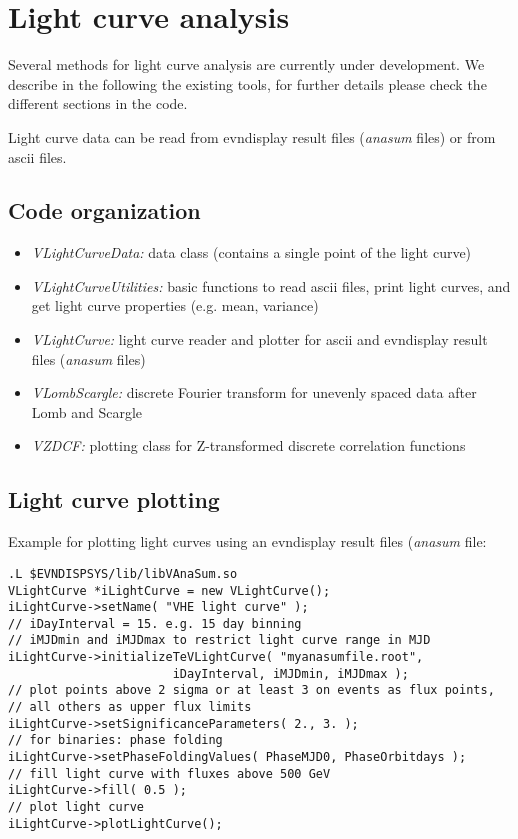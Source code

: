 \documentclass[titlepage,a4paper,twoside,11pt]{report}
\begin{document}
\chapter{Light curve analysis}

Several methods for light curve analysis are currently under development. We describe in the following the existing tools, for further details please check the different sections in the code.

Light curve data can be read from evndisplay result files ({\it anasum} files) or from ascii files.

\section{Code organization}

\begin{itemize}
\item {\it VLightCurveData:} data class (contains a single point of the light curve)
\item {\it VLightCurveUtilities:} basic functions to read ascii files, print light curves, and get light curve properties (e.g. mean, variance)
\item {\it VLightCurve:} light curve reader and plotter for ascii and evndisplay result files ({\it anasum} files)
\item {\it  VLombScargle:} discrete Fourier transform for unevenly spaced data  after Lomb and Scargle
\item {\it VZDCF:} plotting class for Z-transformed discrete correlation functions
\end{itemize}

\section{Light curve plotting}

Example for plotting light curves using an evndisplay result files ({\it anasum} file:

\begin{lstlisting}
.L $EVNDISPSYS/lib/libVAnaSum.so 
VLightCurve *iLightCurve = new VLightCurve();
iLightCurve->setName( "VHE light curve" );
// iDayInterval = 15. e.g. 15 day binning
// iMJDmin and iMJDmax to restrict light curve range in MJD
iLightCurve->initializeTeVLightCurve( "myanasumfile.root", 
                       iDayInterval, iMJDmin, iMJDmax );
// plot points above 2 sigma or at least 3 on events as flux points, 
// all others as upper flux limits
iLightCurve->setSignificanceParameters( 2., 3. );
// for binaries: phase folding
iLightCurve->setPhaseFoldingValues( PhaseMJD0, PhaseOrbitdays );
// fill light curve with fluxes above 500 GeV
iLightCurve->fill( 0.5 );
// plot light curve
iLightCurve->plotLightCurve();
\end{lstlisting}
\end{document}
